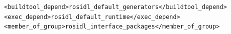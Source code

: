 \documentclass[preview,border=2pt]{standalone}
\begin{document}
\begin{lstlisting}[style=xmlstyle]
<buildtool_depend>rosidl_default_generators</buildtool_depend>
<exec_depend>rosidl_default_runtime</exec_depend>
<member_of_group>rosidl_interface_packages</member_of_group>
\end{lstlisting}
\end{document}

